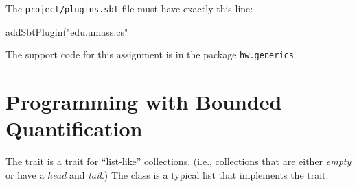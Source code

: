 \documentclass[9pt]{extbook}
\begin{document}
The \texttt{project/plugins.sbt} file must have exactly this line:

\begin{scalacode}
addSbtPlugin("edu.umass.cs" %
\end{scalacode}

The support code for this assignment is in the package \texttt{hw.generics}.

\section{Programming with Bounded Quantification}

The trait  is a trait for ``list-like''
collections. (i.e., collections that are either \emph{empty} or have
a  \emph{head} and \emph{tail}.) The class 
is a typical list that implements the  trait.
\end{document}
